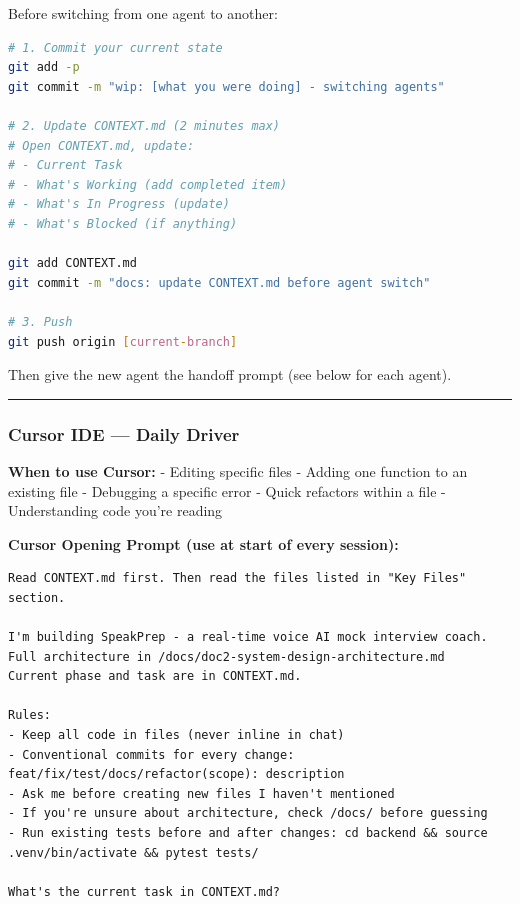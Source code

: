 \documentclass[
  11pt,
]{article}
\begin{document}
Before switching from one agent to another:

\begin{lstlisting}[language=bash]
# 1. Commit your current state
git add -p
git commit -m "wip: [what you were doing] - switching agents"

# 2. Update CONTEXT.md (2 minutes max)
# Open CONTEXT.md, update:
# - Current Task
# - What's Working (add completed item)
# - What's In Progress (update)
# - What's Blocked (if anything)

git add CONTEXT.md
git commit -m "docs: update CONTEXT.md before agent switch"

# 3. Push
git push origin [current-branch]
\end{lstlisting}

Then give the new agent the handoff prompt (see below for each agent).

\begin{center}\rule{0.5\linewidth}{0.5pt}\end{center}

\hypertarget{cursor-ide-daily-driver}{%
\subsubsection{Cursor IDE --- Daily
Driver}\label{cursor-ide-daily-driver}}

\textbf{When to use Cursor:} - Editing specific files - Adding one
function to an existing file - Debugging a specific error - Quick
refactors within a file - Understanding code you're reading

\textbf{Cursor Opening Prompt (use at start of every session):}

\begin{lstlisting}
Read CONTEXT.md first. Then read the files listed in "Key Files" section.

I'm building SpeakPrep - a real-time voice AI mock interview coach.
Full architecture in /docs/doc2-system-design-architecture.md
Current phase and task are in CONTEXT.md.

Rules:
- Keep all code in files (never inline in chat)
- Conventional commits for every change: feat/fix/test/docs/refactor(scope): description
- Ask me before creating new files I haven't mentioned
- If you're unsure about architecture, check /docs/ before guessing
- Run existing tests before and after changes: cd backend && source .venv/bin/activate && pytest tests/

What's the current task in CONTEXT.md?
\end{lstlisting}
\end{document}
